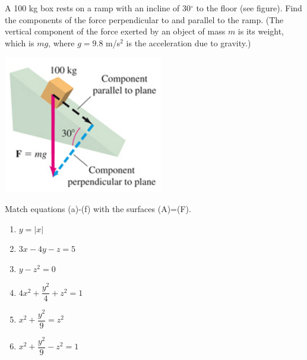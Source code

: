 \documentclass[12pt, addpoints]{exam/exam}
\newcommand{\vstr}{\vspace{\stretch{1}}}
\theoremstyle{plain}
\begin{document}
\begin{questions}
\begin{parts}
\end{parts}

\newpage
\question[16] %
A 100 kg box rests on a ramp with an incline of 30$^{\circ}$ to the floor (see figure).  Find the components of the force perpendicular to and parallel to the ramp.  (The vertical component of the force exerted by an object of mass $m$ is its weight, which is $mg$, where $g=9.8$ m/s$^2$ is the acceleration due to gravity.)

\begin{center}
\includegraphics{exam1BoxOnARamp}
\end{center}

\vstr

\newpage
\question[15] %
Match equations (a)-(f) with the surfaces (A)=(F).
\begin{enumerate}[label=(\alph*)]
	\item $y=|x|$
	\item $3x-4y-z=5$
	\item $y-z^2=0$
	\item $4x^2+\dfrac{y^2}{4}+z^2=1$
	\item $x^2+\dfrac{y^2}{9}=z^2$
	\item $x^2+\dfrac{y^2}{9}-z^2=1$
\end{enumerate}


\end{questions}
\end{document}
